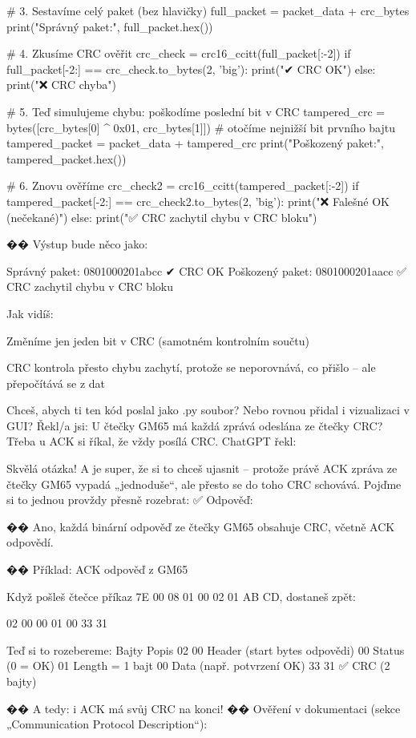 # 3. Sestavíme celý paket (bez hlavičky)
full_packet = packet_data + crc_bytes
print("Správný paket:", full_packet.hex())

# 4. Zkusíme CRC ověřit
crc_check = crc16_ccitt(full_packet[:-2])
if full_packet[-2:] == crc_check.to_bytes(2, 'big'):
    print("✔ CRC OK")
else:
    print("❌ CRC chyba")

# 5. Teď simulujeme chybu: poškodíme poslední bit v CRC
tampered_crc = bytes([crc_bytes[0] ^ 0x01, crc_bytes[1]])  # otočíme nejnižší bit prvního bajtu
tampered_packet = packet_data + tampered_crc
print("Poškozený paket:", tampered_packet.hex())

# 6. Znovu ověříme
crc_check2 = crc16_ccitt(tampered_packet[:-2])
if tampered_packet[-2:] == crc_check2.to_bytes(2, 'big'):
    print("❌ Falešné OK (nečekané)")
else:
    print("✅ CRC zachytil chybu v CRC bloku")

�� Výstup bude něco jako:

Správný paket: 0801000201abcc
✔ CRC OK
Poškozený paket: 0801000201aacc
✅ CRC zachytil chybu v CRC bloku

Jak vidíš:

    Změníme jen jeden bit v CRC (samotném kontrolním součtu)

    CRC kontrola přesto chybu zachytí, protože se neporovnává, co přišlo – ale přepočítává se z dat

Chceš, abych ti ten kód poslal jako .py soubor? Nebo rovnou přidal i vizualizaci v GUI?
Řekl/a jsi:
U čtečky GM65 má každá zprává odeslána ze čtečky CRC? Třeba u ACK si říkal, že vždy posílá CRC. 
ChatGPT řekl:

Skvělá otázka! A je super, že si to chceš ujasnit – protože právě ACK zpráva ze čtečky GM65 vypadá „jednoduše“, ale přesto se do toho CRC schovává. Pojďme si to jednou provždy přesně rozebrat:
✅ Odpověď:

    �� Ano, každá binární odpověď ze čtečky GM65 obsahuje CRC, včetně ACK odpovědí.

�� Příklad: ACK odpověď z GM65

Když pošleš čtečce příkaz 7E 00 08 01 00 02 01 AB CD, dostaneš zpět:

02 00 00 01 00 33 31

Teď si to rozebereme:
Bajty	Popis
02 00	Header (start bytes odpovědi)
00	Status (0 = OK)
01	Length = 1 bajt
00	Data (např. potvrzení OK)
33 31	✅ CRC (2 bajty)

�� A tedy: i ACK má svůj CRC na konci!
�� Ověření v dokumentaci (sekce „Communication Protocol Description“):

